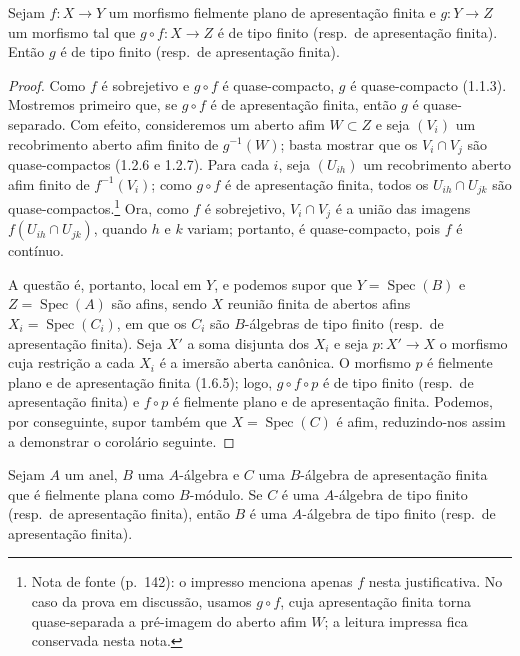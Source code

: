 \begin{proposition}[11.3.16]
\label{IV.11.3.16}
Sejam $f:X\to Y$ um morfismo
fielmente plano de apresentação
finita e $g:Y\to Z$ um morfismo
tal que $g\circ f:X\to Z$ é de
tipo finito (resp.\ de apresentação
finita). Então $g$ é de tipo finito
(resp.\ de apresentação finita).
\end{proposition}

\begin{proof}
Como $f$ é sobrejetivo e $g\circ f$
é quase-compacto, $g$ é quase-compacto
(1.1.3). Mostremos primeiro que,
se $g\circ f$ é de apresentação
finita, então $g$ é quase-separado.
Com efeito, consideremos um aberto
afim $W\subset Z$ e seja $(V_i)$
um recobrimento aberto afim finito
de $g^{-1}(W)$; basta mostrar que
os $V_i\cap V_j$ são quase-compactos
(1.2.6 e 1.2.7). Para cada $i$,
seja $(U_{ih})$ um recobrimento aberto
afim finito de $f^{-1}(V_i)$; como
$g\circ f$ é de apresentação finita,
todos os $U_{ih}\cap U_{jk}$ são
quase-compactos.\footnote{Nota de fonte (p.~142): o impresso menciona apenas $f$ nesta justificativa. No caso da prova em discussão, usamos $g\circ f$, cuja apresentação finita torna quase-separada a pré-imagem do aberto afim $W$; a leitura impressa fica conservada nesta nota.} Ora, como $f$ é
sobrejetivo, $V_i\cap V_j$ é a união
das imagens $f(U_{ih}\cap U_{jk})$,
quando $h$ e $k$ variam; portanto,
é quase-compacto, pois $f$ é
contínuo.

A questão é, portanto, local em $Y$,
e podemos supor que
$Y=\operatorname{Spec}(B)$ e
$Z=\operatorname{Spec}(A)$ são afins,
sendo $X$ reunião finita de abertos
afins $X_i=\operatorname{Spec}(C_i)$,
em que os $C_i$ são $B$-álgebras
de tipo finito (resp.\ de apresentação
finita). Seja $X'$ a soma disjunta
dos $X_i$ e seja $p:X'\to X$ o
morfismo cuja restrição a cada
$X_i$ é a imersão aberta canônica.
O morfismo $p$ é fielmente plano
e de apresentação finita (1.6.5);
logo, $g\circ f\circ p$ é de tipo
finito (resp.\ de apresentação
finita) e $f\circ p$ é fielmente
plano e de apresentação finita.
Podemos, por conseguinte, supor
também que $X=\operatorname{Spec}(C)$
é afim, reduzindo-nos assim a
demonstrar o corolário seguinte.
\end{proof}

\begin{corollary}[11.3.17]
\label{IV.11.3.17}
Sejam $A$ um anel, $B$ uma
$A$-álgebra e $C$ uma $B$-álgebra
de apresentação finita que é
fielmente plana como $B$-módulo.
Se $C$ é uma $A$-álgebra de tipo
finito (resp.\ de apresentação
finita), então $B$ é uma
$A$-álgebra de tipo finito
(resp.\ de apresentação finita).
\end{corollary}

